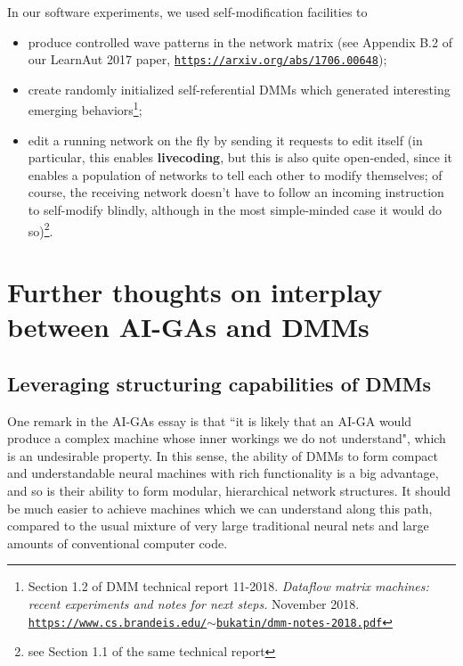 \documentclass{article}
\begin{document}
\vspace{0.1in}
\noindent
In our software experiments, we used self-modification facilities to

  \begin{itemize}
     \item produce controlled wave patterns in the network matrix (see Appendix B.2 of our LearnAut 2017 paper, \href{https://arxiv.org/abs/1706.00648}{\tt https://arxiv.org/abs/1706.00648});
     \item create randomly initialized self-referential DMMs which generated interesting emerging behaviors\footnote{Section 1.2
of DMM technical report 11-2018. {\em Dataflow matrix machines: recent experiments and notes for next steps.} November 2018. \href{https://www.cs.brandeis.edu/~bukatin/dmm-notes-2018.pdf}
{\tt https://www.cs.brandeis.edu/$\sim$bukatin/dmm-notes-2018.pdf}};

     \item edit a running network on the fly by sending it requests to edit itself (in particular, this enables {\bf livecoding}, but this is also quite open-ended, since it enables a population of networks to tell each other to modify themselves; of course, the receiving network doesn't have to follow an incoming instruction to self-modify blindly, although in the most simple-minded case it would do so)\footnote{see Section 1.1 of the same technical report}.
  \end{itemize}

\section{Further thoughts on interplay between AI-GAs and DMMs}

\subsection{Leveraging structuring capabilities of DMMs}

One remark in the AI-GAs essay is that ``it is likely that an AI-GA would produce a complex machine whose inner workings we do not understand", which is an undesirable property. In this sense, the ability of DMMs to form compact and understandable neural machines with rich functionality is a big advantage, and so is their ability to form modular, hierarchical network structures. It should be much easier to achieve machines which we can understand along this path, compared to
the usual mixture of very large traditional neural nets and large amounts of conventional computer code.
\end{document}
